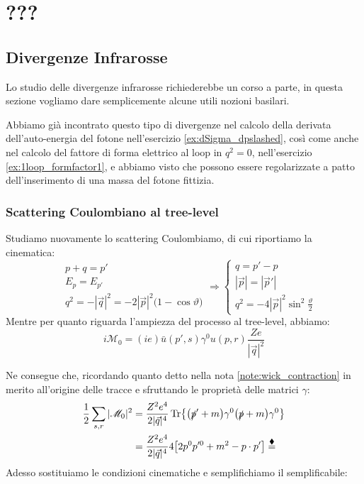 \documentclass[../main.tex]{subfiles}
\begin{document}
\setchapterpreamble[u]{\margintoc}
\chapter[???]{???\footnotemark[0]}
\fboxsep =1pt %

\section{Divergenze Infrarosse}
Lo studio delle divergenze infrarosse richiederebbe un corso a parte, in questa sezione vogliamo dare semplicemente alcune utili nozioni basilari.

Abbiamo già incontrato questo tipo di divergenze nel calcolo della derivata dell'auto-energia del fotone nell'esercizio \ref{ex:dSigma_dpslashed}, così come anche nel calcolo del fattore di forma elettrico al loop in $q^2=0$, nell'esercizio \ref{ex:1loop_formfactor1}, e abbiamo visto che possono essere regolarizzate a patto dell'inserimento di una massa del fotone fittizia.

\subsection{Scattering Coulombiano al tree-level}
Studiamo nuovamente lo scattering Coulombiamo, di cui riportiamo la cinematica:
\[
\begin{aligned}
&p+q=p' \\
&E_p = E_{p'} \\\
&q^2=-|\Vec q|^2 = -2|\Vec p|^2\big(1-\cos\vartheta\big)
\end{aligned}
\Rightarrow
\begin{cases}
q = p' - p \\
|\Vec p| = |\Vec p'|\\
\boxed{q^2 = -4|\Vec p|^2 \sin^2\frac{\vartheta}{2}} 
\end{cases}
\]
Mentre per quanto riguarda l'ampiezza del processo al tree-level, abbiamo:
\[
\boxed{i\mathscr M_0  = (ie)\bar u (p',s)\gamma^0 u (p,r) \frac{Ze}{|\Vec{q}|^2}}
\]

Ne consegue che, ricordando quanto detto nella nota \ref{note:wick_contraction} in merito all'origine delle tracce e sfruttando le proprietà delle matrici $\gamma$:
\begin{align*}
    \frac{1}{2}\sum_{s,r}|\mathscr M_0|^2 &= \frac{Z^2e^4}{2|\Vec{q}|^4}\Tr{\big(\slashed p' + m\big)\gamma^0 \big(\slashed p + m\big)\gamma^0}\\
    &=\frac{Z^2e^4}{2|\Vec{q}|^4}4\big[2p^0p'^0 + m^2-p\cdot p'\big] \overset{\blacklozenge}{=}
\end{align*}
Adesso sostituiamo le condizioni cinematiche e semplifichiamo il semplificabile:
\end{document}
